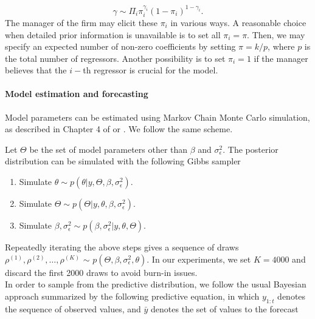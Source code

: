 $$
\gamma \sim \Pi_i \pi_i^{\gamma_i}(1-\pi_i)^{1-\gamma_i}.
$$
The manager of the firm may elicit these $\pi_i$ in various ways. A reasonable choice when detailed prior information is unavailable is to set all $\pi_i = \pi$. Then, we may specify an expected number of non-zero coefficients by setting $\pi = k/p$, where $p$ is the total number of regressors. Another possibility is to set $\pi_i = 1$ if the manager believes that the $i-$th regressor is crucial for the model. %

\paragraph{Model estimation and forecasting}\label{s:MCMC}

Model parameters can be estimated using Markov Chain Monte Carlo simulation, as described in Chapter 4 of \parencite{petris2009dynamic} or \parencite{scott2014predicting}. We follow the same scheme.

Let $\Theta$ be the set of model parameters other than $\beta$ and $\sigma^2_{\epsilon}$. The posterior distribution can be simulated with the following Gibbs sampler %

\begin{enumerate}
\item Simulate $\theta \sim p(\theta | y, \Theta, \beta, \sigma^2_{\epsilon})$.
\item Simulate $\Theta \sim p(\Theta | y, \theta, \beta, \sigma^2_{\epsilon})$.
\item Simulate $\beta, \sigma^2_{\epsilon} \sim p(\beta, \sigma^2_{\epsilon} | y, \theta, \Theta)$.
\end{enumerate}
Repeatedly iterating the above steps gives a sequence of draws $\rho^{(1)}, \rho^{(2)}, \ldots, \rho^{(K)}$ $\sim$ $p(\Theta, \beta, \sigma^2_{\epsilon}, \theta)$. In our experiments, we set $K = 4000$ and discard the first 2000 draws to avoid burn-in issues. \\

In order to sample from the predictive distribution, we follow the usual Bayesian approach summarized by the following predictive equation, in which $y_{1:t}$ denotes the sequence of observed values, and $\bar{y}$ denotes the set of values to the forecast

